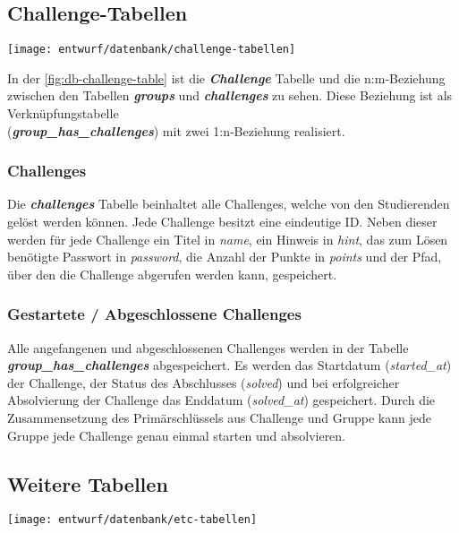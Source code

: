 \subsection{Challenge-Tabellen}
\begin{center}
	\texttt{[image: entwurf/datenbank/challenge-tabellen]}
	\label{fig:db-challenge-table}
\end{center}
In der \autoref{fig:db-challenge-table} ist die \textbf{\textit{Challenge}} Tabelle und die n:m-Beziehung zwischen den Tabellen \textbf{\textit{groups}} und \textbf{\textit{challenges}} zu sehen. Diese Beziehung ist als Verknüpfungstabelle\\ (\textbf{\textit{group\_has\_challenges}}) mit zwei 1:n-Beziehung realisiert.

\subsubsection{Challenges}
Die \textbf{\textit{challenges}} Tabelle beinhaltet alle Challenges, welche von den Studierenden gelöst werden können. Jede Challenge besitzt eine eindeutige ID. Neben dieser werden für jede Challenge ein Titel in \textit{name}, ein Hinweis in \textit{hint}, das zum Lösen benötigte Passwort in \textit{password}, die Anzahl der Punkte in \textit{points} und der Pfad, über den die Challenge abgerufen werden kann, gespeichert.

\subsubsection{Gestartete / Abgeschlossene Challenges}
Alle angefangenen und abgeschlossenen Challenges werden in der Tabelle \\
\textbf{\textit{group\_has\_challenges}} abgespeichert. Es werden das Startdatum (\textit{started\_at}) der Challenge, der Status des Abschlusses (\textit{solved}) und bei erfolgreicher Absolvierung der Challenge das Enddatum (\textit{solved\_at}) gespeichert. Durch die Zusammensetzung des Primärschlüssels aus Challenge und Gruppe kann jede Gruppe jede Challenge genau einmal starten und absolvieren.

\subsection{Weitere Tabellen}
\begin{center}
	\texttt{[image: entwurf/datenbank/etc-tabellen]}
	\label{fig:db-etc-table}
\end{center}

